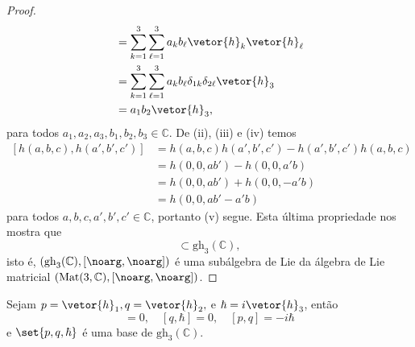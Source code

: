 \begin{proof}
\begin{align*}
                                      &= \sum_{k = 1}^3 \sum_{\ell = 1}^3 a_k b_\ell \vetor{h}_k \vetor{h}_\ell\\
                                      &= \sum_{k = 1}^3\sum_{\ell = 1}^3 a_k b_\ell \delta_{1k} \delta_{2\ell} \vetor{h}_3\\
                                      &= a_1 b_2 \vetor{h}_3,
    \end{align*}
    para todos \(a_1,a_2,a_3, b_1,b_2,b_3 \in \mathbb{C}\). De (ii), (iii) e (iv) temos
    \begin{align*}
        \left[h(a,b,c),h(a',b',c')\right] &= h(a,b,c) h(a',b',c') - h(a', b', c') h(a,b,c)\\
                                          &= h(0,0,ab') - h(0,0,a'b) \\
                                          &= h(0,0,ab') + h(0,0,-a'b) \\
                                          &= h(0,0,ab' - a'b)
    \end{align*}
    para todos \(a,b,c,a',b',c' \in \mathbb{C}\), portanto (v) segue. Esta última propriedade nos mostra que
    \begin{equation*}
        [\mathrm{gh}_3(\mathbb{C}), \mathrm{gh}_3(\mathbb{C})] \subset \mathrm{gh}_3(\mathbb{C}),
    \end{equation*}
    isto é, \(\left(\mathrm{gh}_3(\mathbb{C}), [\noarg,\noarg]\right)\) é uma subálgebra de Lie da álgebra de Lie matricial \(\left(\mathrm{Mat}(3, \mathbb{C}), [\noarg, \noarg]\right)\).
\end{proof}
\begin{corollary}
    Sejam \(p = \vetor{h}_1, q = \vetor{h}_2,\) e \(\hbar = i\vetor{h}_3\), então
    \begin{equation*}
        [p,\hbar] = 0,\quad
        [q,\hbar] = 0,\quad
        [p,q] = -i\hbar
    \end{equation*}
    e \(\set{p,q,\hbar}\) é uma base de \(\mathrm{gh}_3(\mathbb{C})\).
\end{corollary}
